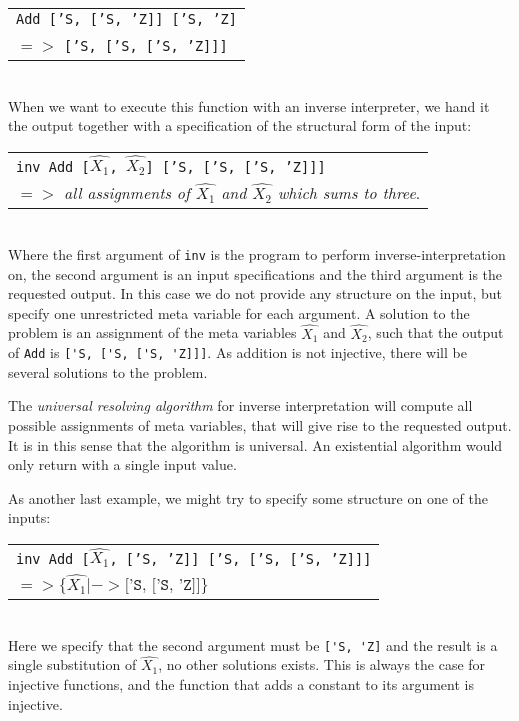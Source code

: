 \documentclass[10pt]{../sigplanconf}
\begin{document}
\begin{tabular}{l}
\texttt{Add ['S, ['S, 'Z]] ['S, 'Z]} \\
\quad $=>$ \texttt{['S, ['S, ['S, 'Z]]]}
\end{tabular}\\

When we want to execute this function with an inverse interpreter, we
hand it the output together with a
specification of the structural form of the input:\\

\hspace{-4mm}
\begin{tabular}{l}
  \texttt{inv Add [$\widehat{X_1}$, $\widehat{X_2}$] ['S, ['S, ['S, 'Z]]]} \\
  \quad $=>$ \textit{all assignments of $\widehat{X_1}$ and $\widehat{X_2}$ which sums to three}.
\end{tabular}\\

Where the first argument of \texttt{inv} is the program to perform
inverse-interpretation on, the second argument is an input
specifications and the third argument is the requested output. In this
case we do not provide any structure on the input, but specify one
unrestricted meta variable for each argument. A solution to the
problem is an assignment of the meta variables $\widehat{X_1}$ and
$\widehat{X_2}$, such that the output of \texttt{Add} is
\verb|['S, ['S, ['S, 'Z]]]|. As addition is not injective, there will
be several solutions to the problem.

The \textit{universal resolving algorithm} for inverse interpretation
will compute all possible assignments of meta variables, that will
give rise to the requested output. It is in this sense that the
algorithm is universal. An existential algorithm would only return
with a single input value.

As another last example, we might try to specify some structure on one
of the inputs:\\

\hspace{-4mm}
\begin{tabular}{l}
  \texttt{inv Add [$\widehat{X_1}$, ['S, 'Z]] ['S, ['S, ['S, 'Z]]]} \\
   \quad $=> \{ \widehat{X_1} |-> \texttt{['S, ['S, 'Z]]} \}$
\end{tabular}\\

Here we specify that the second argument must be \verb|['S, 'Z]| and
the result is a single substitution of $\widehat{X_1}$, no other solutions
exists. This is always the case for injective functions, and the
function that adds a constant to its argument is injective.\\
\end{document}
